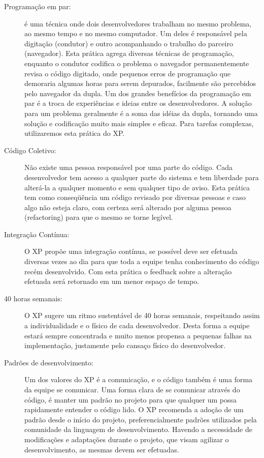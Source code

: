 \begin{description}
  \item [Programação em par:] é uma técnica onde dois desenvolvedores trabalham no mesmo problema, ao mesmo tempo e no mesmo computador. Um deles é responsável pela digitação (condutor) e outro acompanhando o trabalho do parceiro (navegador). Esta prática agrega diversas técnicas de programação, enquanto o condutor codifica o problema o navegador permanentemente revisa o código digitado, onde pequenos erros de programação que demoraria algumas horas para serem depurados, facilmente são percebidos pelo navegador da dupla. Um dos grandes benefícios da programação em par é a troca de experiências e ideias entre os desenvolvedores. A solução para um problema geralmente é a soma das idéias da dupla, tornando uma solução e codificação muito mais simples e eficaz. Para tarefas complexas, utilizaremos esta prática do XP.

  \item [Código Coletivo:] Não existe uma pessoa responsável por uma parte do código. Cada desenvolvedor tem acesso a qualquer parte do sistema e tem liberdade para alterá-la a qualquer momento e sem qualquer tipo de aviso. Esta prática tem como conseqüência um código revisado por diversas pessoas e caso algo não esteja claro, com certeza será alterado por alguma pessoa (refactoring) para que o mesmo se torne legível.

  \item [Integração Contínua:] O XP propõe uma integração contínua, se possível deve ser efetuada diversas vezes ao dia para que toda a equipe tenha conhecimento do código recém desenvolvido. Com esta prática o feedback sobre a alteração efetuada será retornado em um menor espaço de tempo.

  \item [40 horas semanais:] O XP sugere um ritmo sustentável de 40 horas semanais, respeitando assim a individualidade e o físico de cada desenvolvedor. Desta forma a equipe estará sempre concentrada e muito menos propensa a pequenas falhas na implementação, justamente pelo cansaço físico do desenvolvedor.

  \item [Padrões de desenvolvimento:] Um dos valores do XP é a comunicação, e o código também é uma forma da equipe se comunicar. Uma forma clara de se comunicar através do código, é manter um padrão no projeto para que qualquer um possa rapidamente entender o código lido. O XP recomenda a adoção de um padrão desde o início do projeto, preferencialmente padrões utilizados pela comunidade da linguagem de desenvolvimento. Havendo a necessidade de modificações e adaptações durante o projeto, que visam agilizar o desenvolvimento, as mesmas devem ser efetuadas.

\end{description}

